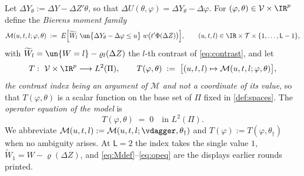 \begin{definition}\label{def:operator}
Let $\Delta Y_\theta:=\Delta Y-\Delta Z'\theta$, so that $\Delta U(\theta,\varphi)=\Delta Y_\theta-\Delta\varphi$.
For $(\varphi,\theta)\in\mathcal V\times\IR^{p}$ define the \emph{Bierens moment family}
\begin{equation}\label{eq:Mdef}
\mathcal M(u,t,l;\varphi,\theta)
\;:=\;E\Big[\widetilde W_l\;\un\big\{\Delta Y_\theta-\Delta\varphi\le u\big\}\;w\big(t'\Phi(\Delta Z)\big)\Big],
\qquad (u,t,l)\in\IR\times\mathcal T\times\{1,\dots,\mathsf L-1\},
\end{equation}
with $\widetilde W_l=\un\{W=l\}-\varrho_l(\Delta Z)$ the $l$-th contrast of \eqref{eq:contrast}, and let
\begin{equation}\label{eq:Tdef}
T:\ \mathcal V\times\IR^{p}\longrightarrow L^{2}(\Pi),
\qquad
T(\varphi,\theta)\;:=\;\big[(u,t,l)\mapsto\mathcal M(u,t,l;\varphi,\theta)\big],
\end{equation}
\emph{the contrast index being an argument of $\mathcal M$ and not a coordinate of its value}, so that
$T(\varphi,\theta)$ is a scalar function on the base set of $\Pi$ fixed in \cref{def:spaces}. The
\emph{operator equation of the model} is
\begin{equation}\label{eq:opeq}
T(\varphi,\theta)\;=\;0 \quad\text{in }L^{2}(\Pi).
\end{equation}
We abbreviate $\mathcal M(u,t,l):=\mathcal M(u,t,l;\vdagger,\theta_\dagger)$ and
$T(\varphi):=T(\varphi,\theta_\dagger)$ when no ambiguity arises. At $\mathsf L=2$ the index takes
the single value $1$, $\widetilde W_1=W-\varrho(\Delta Z)$, and
\eqref{eq:Mdef}--\eqref{eq:opeq} are the displays earlier rounds printed.
\end{definition}

